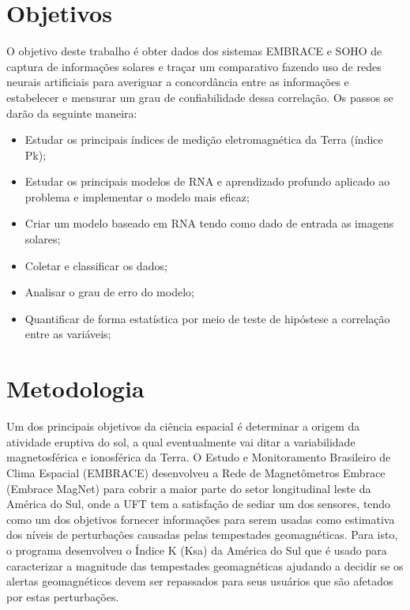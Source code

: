 \documentclass[12pt,2019]{uftpibic}
\begin{document}
\vspace{1.5cm}
\chapter{Objetivos}

O objetivo deste trabalho é obter dados dos sistemas EMBRACE e SOHO de captura de informações solares e traçar um comparativo fazendo uso de redes neurais artificiais para averiguar a concordância entre as informações e estabelecer e mensurar um grau de confiabilidade dessa correlação. Os passos se darão da seguinte maneira:

\begin{itemize}
\item Estudar os principais índices de medição eletromagnética da Terra (índice Pk);
\item Estudar os principais modelos de RNA e aprendizado profundo aplicado ao problema e implementar o modelo mais eficaz;
\item Criar um modelo baseado em RNA tendo como dado de entrada as imagens solares;
\item Coletar e classificar os dados;
\item Analisar o grau de erro do modelo;
\item Quantificar de forma estatística por meio de teste de hipóstese a correlação entre as variáveis;
\end{itemize}


\vspace{1.5cm}
\chapter{Metodologia}

Um dos principais objetivos da ciência espacial é determinar a origem da atividade eruptiva do sol, a qual eventualmente vai ditar a variabilidade magnetosférica e ionosférica da Terra. O Estudo e Monitoramento Brasileiro de Clima Espacial (EMBRACE) desenvolveu a Rede de Magnetômetros Embrace (Embrace MagNet) para cobrir a maior parte do setor longitudinal leste da América do Sul, onde a UFT tem a satisfação de sediar um dos sensores, tendo como um dos objetivos fornecer informações para serem usadas como estimativa dos níveis de perturbações causadas pelas tempestades geomagnéticas. Para isto, o programa desenvolveu o Índice K (Ksa) da América do Sul que é usado para caracterizar a magnitude das tempestades geomagnéticas ajudando a decidir se os alertas geomagnéticos devem ser repassados para seus usuários que são afetados por estas perturbações.
\end{document}
